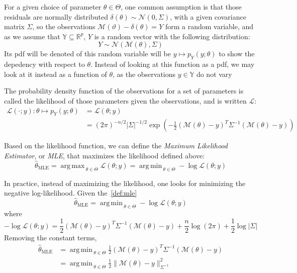 \documentclass[a4paper,11pt]{article}
\newcommand{\Yspace}{\mathbb{Y}}
\newcommand{\estimtxt}[2]{\hat{#1}_{\mathrm{#2}}}
\DeclareMathOperator*{\argmin}{arg\,min \,}
\DeclareMathOperator*{\argmax}{arg\,max \,}
\theoremstyle{defi}
\numberwithin{thmCounter}{section}
\begin{document}
For a given choice of parameter $\theta\in\Theta$, one common assumption is that those residuals are normally distributed $\delta(\theta) \sim \mathcal{N}(0, \Sigma)$, with a given covariance matrix $\Sigma$, so the observations $\mathscr{M}(\vartheta) - \delta(\theta)=Y$ form a random variable, and as we assume that $\Yspace \subseteq \mathbb{R}^p$, $Y$ is a random vector with the following distribution:
\begin{equation}
  \label{eq:lik_gaussian}
  Y  \sim \mathcal{N}(\mathcal{M}(\theta), \Sigma)
\end{equation}
Its pdf will be denoted of this random variable will be  $y \mapsto p_Y(y;\theta)$ to show the depedency with respect to $\theta$. Instead of looking at this function as a pdf, we may look at it instead as a function of $\theta$, as the observations $y\in\Yspace$ do not vary
\begin{definition}
  \label{def:mle}
  The probability density function of the observations for a set of parameters is called the likelihood of those parameters given the observations, and is written $\mathcal{L}$:
  \begin{align}
    \label{eq:likelihood_definition}
    \mathcal{L}(\cdot ;y): \theta \mapsto p_{Y}(y;\theta) &= \mathcal{L}(\theta;y) \\
    &=(2\pi)^{-n/2}\lvert \Sigma \rvert^{-1/2}\exp\left(-\frac{1}{2}(\mathcal{M}(\theta) - y)^T\Sigma^{-1}(\mathcal{M}(\theta) - y)\right)
  \end{align}

  Based on the likelihood function, we can define the \emph{Maximum Likelihood Estimator}, or \emph{MLE}, that maximizes the likelihood defined above:
  \begin{equation}
    \label{eq:def_MLE}
    \estimtxt{\theta}{MLE} = \argmax_{\theta\in\Theta}\mathcal{L}(\theta;y) = \argmin_{\theta \in \Theta} -\log \mathcal{L}(\theta;y)
  \end{equation}

\end{definition}
  In practice, instead of maximizing the likelihood, one looks for minimizing the negative log-likelihood. Given the~\cref{def:mle}
  \begin{equation}
    \estimtxt{\theta}{MLE} = \argmin_{\theta \in \Theta} -\log \mathcal{L}(\theta;y)
  \end{equation}
  where
  \begin{equation*}
    -\log\mathcal{L}(\theta;y) = \frac{1}{2}(\mathcal{M}(\theta) - y)^T\Sigma^{-1}(\mathcal{M}(\theta) - y)+  \frac{n}{2}\log(2\pi) + \frac{1}{2}\log\lvert \Sigma \rvert
  \end{equation*}
  Removing the constant terms,
  \begin{align*}
    \estimtxt{\theta}{MLE} &= \argmin_{\theta \in \Theta}\frac{1}{2}(\mathcal{M}(\theta) - y)^T\Sigma^{-1}(\mathcal{M}(\theta) - y)\\ &= \argmin_{\theta \in \Theta}\frac12 \|\mathcal{M}(\theta) - y \|^2_{\Sigma^{-1}}
  \end{align*}
\end{document}
